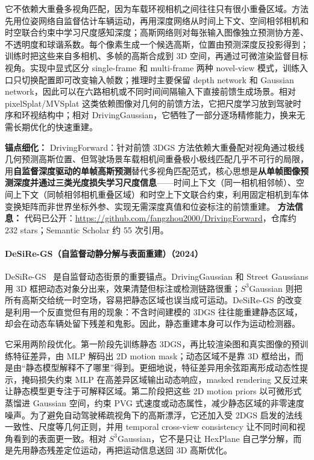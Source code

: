 它不依赖大重叠多视角匹配，因为车载环视相机之间往往只有很小重叠区域。方法先用位姿网络自监督估计车辆运动，再用深度网络从时间上下文、空间相邻相机和时空联合约束中学习尺度感知深度；高斯网络则对每张输入图像独立预测协方差、不透明度和球谐系数。每个像素生成一个候选高斯，位置由预测深度反投影得到；训练时把这些来自多相机、多帧的高斯合成到 3D 空间，再通过可微渲染监督目标视角。实现中显式区分 single-frame 和 multi-frame 两种 novel-view 模式，训练入口只切换配置即可改变输入帧数；推理时主要保留 depth network 和 Gaussian network，因此可以在六路相机或不同时间间隔输入下直接前馈生成场景。相对 pixelSplat/MVSplat 这类依赖图像对几何的前馈方法，它把尺度学习放到驾驶时序和环视结构中；相对 DrivingGaussian，它牺牲了一部分逐场精修能力，换来无需长期优化的快速重建。

\textbf{锚点细化：} DrivingForward：针对前馈 3DGS 方法依赖大重叠配对视角通过极线几何预测高斯位置、但驾驶场景车载相机间重叠极小极线匹配几乎不可行的局限，用\textbf{自监督深度驱动的单帧高斯预测}替代多视角匹配范式，核心思想是\textbf{从单帧图像预测深度并通过三类光度损失学习尺度信息}——时间上下文（同一相机相邻帧）、空间上下文（同帧相邻相机重叠区域）和时空上下文联合约束，利用固定相机到车体变换矩阵而非世界坐标外参、实现无需深度真值和位姿标注的前馈重建。
\textbf{方法信息：} 代码已公开：\url{https://github.com/fangzhou2000/DrivingForward}，仓库约 232 stars；Semantic Scholar 约 55 次引用。



\paragraph{DeSiRe-GS（自监督动静分解与表面重建）（2024）}
DeSiRe-GS~\cite{2411_11921} 是自监督动态街景的重要锚点。DrivingGaussian 和 Street Gaussians 用 3D 框把动态对象分出来，效果清楚但标注或检测链路很重；$S^3$Gaussian 则把所有高斯交给统一时空场，容易把静态区域也误当成可运动。DeSiRe-GS 的改变是利用一个反直觉但有用的现象：不含时间建模的 3DGS 往往能重建静态区域，却会在动态车辆处留下残差和鬼影。因此，静态重建本身可以作为运动检测器。

它采用两阶段优化。第一阶段先训练静态 3DGS，再比较渲染图和真实图像的预训练特征差异，由 MLP 解码出 2D motion mask；动态区域不是靠 3D 框给出，而是由“静态模型解释不了哪里”得到。更细地说，特征差异用余弦距离形成动态性提示，掩码损失约束 MLP 在高差异区域输出动态响应，masked rendering 又反过来让静态模型更专注于可解释区域。第二阶段把这些 2D motion priors 以可微形式蒸馏进 Gaussian 空间，约束 PVG 式速度或动态属性，减少静态区域的非零速度噪声。为了避免自动驾驶稀疏视角下的高斯漂浮，它还加入受 2DGS 启发的法线一致性、尺度等几何正则，并用 temporal cross-view consistency 让不同时间和视角看到的表面更一致。相对 $S^3$Gaussian，它不是只让 HexPlane 自己学分解，而是先用静态残差定位运动，再把运动信息送回 3D 高斯优化。

